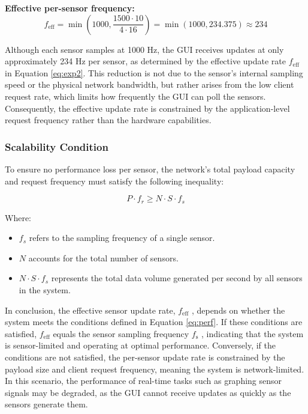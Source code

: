 \textbf{Effective per-sensor frequency:}
\begin{equation}
f_{\text{eff}} = \min \left( 1000, \frac{1500 \cdot 10}{4 \cdot 16} \right) = \min(1000, 234.375) \approx 234
\label{eq:exp2}
\end{equation}

Although each sensor samples at 1000 Hz, the GUI receives updates at only approximately 
234 Hz per sensor, as determined by the effective update rate $f_\text{eff}$ in Equation \ref{eq:exp2}. 
This reduction is not due to the sensor's internal sampling speed or the physical 
network bandwidth, but rather arises from the low client request rate, which limits 
how frequently the GUI can poll the sensors. Consequently, the effective update rate 
is constrained by the application-level request frequency rather than the hardware 
capabilities.



\subsubsection{Scalability Condition}

To ensure no performance loss per sensor, the network's total payload capacity 
and request frequency must satisfy the following inequality:

\begin{equation}
P \cdot f_r \geq N \cdot S \cdot f_s
\label{eq:perf}
\end{equation}

Where:
\begin{itemize}
    \item[] $f_s$ refers to the sampling frequency of a single sensor.
    \item[] $N$ accounts for the total number of sensors.
    \item[] $N \cdot S \cdot f_s$ represents the total data volume generated per second by all sensors in the system.
\end{itemize}


In conclusion, the effective sensor update rate, $f_\text{eff}$ , depends on whether the system 
meets the conditions defined in Equation \ref{eq:perf}. If these conditions are satisfied, 
$f_\text{eff}$  equals the sensor sampling frequency $f_\text{s}$ , indicating that the system is 
sensor-limited and operating at optimal performance. Conversely, if the conditions are 
not satisfied, the per-sensor update rate is constrained by the payload size and client 
request frequency, meaning the system is network-limited. In this scenario, the 
performance of real-time tasks such as graphing sensor signals may be degraded, as the 
GUI cannot receive updates as quickly as the sensors generate them.


